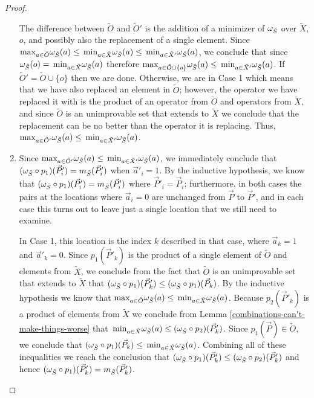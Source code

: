 \documentclass[twocolumn,showpacs,preprintnumbers,amsmath,amssymb,nofootinbib,pra,floatfix]{revtex4-1}
\newcommand{\lst}{\vec}
\newcommand{\set}{\tilde}
\begin{document}
\begin{proof}
\begin{enumerate}
The difference between $\set O$ and $\set O'$ is the addition of a minimizer of $\om_{\set S}$ over $\set X$, $o$, and possibly also the replacement of a single element.  Since $\max_{a\in\set O}\om_{\set S}(a)\le\min_{a\in\set X}\om_{\set S}(a)\le\min_{a\in\set X'}\om_{\set S}(a)$, we conclude that since $\om_{\set S}(o)=\min_{a\in\set X}\om_{\set S}(a)$ therefore $\max_{a\in\set O\cup\{o\}}\om_{\set S}(a)\le\min_{a\in\set X'}\om_{\set S}(a)$.  If $\set O'=\set O\cup\{o\}$ then we are done.  Otherwise, we are in Case 1 which means that we have also replaced an element in $\set O$;  however, the operator we have replaced it with is the product of an operator from $\set O$ and operators from $\set X$, and since $\set O$ is an unimprovable set that extends to $\set X$ we conclude that the replacement can be no better than the operator it is replacing.  Thus, $\max_{a\in\set O'}\om_{\set S}(a)\le\min_{a\in\set X'}\om_{\set S}(a)$.
\item

Since $\max_{a\in\set O'}\om_{\set S}(a)\le\min_{a\in\set X'}\om_{\set S}(a)$, we immediately conclude that $(\om_{\set S}\circ p_1)(\lst P'_i)=m_{\set S}(\lst P'_i)$ when $\lst a'_i=1$.  By the inductive hypothesis, we know that $(\om_{\set S}\circ p_1)(\lst P'_i)=m_{\set S}(\lst P'_i)$ where $\lst P'_i=\lst P_i$;  furthermore, in both cases the pairs at the locations where $\lst a_i=0$ are unchanged from $\lst P$ to $\lst P'$, and in each case this turns out to leave just a single location that we still need to examine.

In Case 1, this location is the index $k$ described in that case, where $\lst a_k=1$ and $\lst a'_k=0$.  Since $p_1(\lst P'_k)$ is the product of a single element of $\set O$ and elements from $\set X$, we conclude from the fact that $\set O$ is an unimprovable set that extends to $\set X$ that $(\om_{\set S}\circ p_1)(\lst P'_k)\le(\om_{\set S}\circ p_1)(\lst P_k)$.  By the inductive hypothesis we know that $\max_{a\in\set O}\om_{\set S}(a)\le\min_{a\in\set X}\om_{\set S}(a)$.  Because $p_2(\lst P'_k)$ is a product of elements from $\set X$ we conclude from Lemma \ref{combinations-can't-make-things-worse} that $\min_{a\in\set X}\om_{\set S}(a)\le (\om_{\set S}\circ p_2)(\lst P'_k)$.  Since $p_1(\lst P)\in\set O$, we conclude that $(\om_{\set S}\circ p_1)(\lst P_k)\le\min_{a\in\set X}\om_{\set S}(a)$.  Combining all of these inequalities we reach the conclusion that $(\om_{\set S}\circ p_1)(\lst P'_k)\le(\om_{\set S}\circ p_2)(\lst P'_k)$ and hence $(\om_{\set S}\circ p_1)(\lst P'_k)=m_{\set S}(\lst P'_k)$.


\end{enumerate}
\end{proof}
\end{document}
